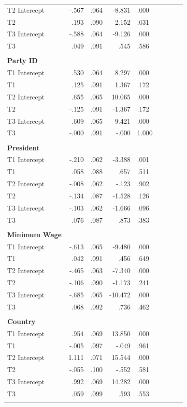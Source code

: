 \documentclass[12pt,econ]{sources/authesis}
\begin{document}
\begin{longtable}{lr@{}lr@{}lr@{}lr@{}l}
 T2 Intercept & -.567 & .064 & -8.831 & .000 \\
 T2 & .193 & .090 & 2.152 & .031 \\
 T3 Intercept & -.588 & .064 & -9.126 & .000 \\ 
 T3 & .049 & .091 & .545 & .586 \\ 
 & & & & \\  
  \textbf{Party ID} & & & & \\  
 T1 Intercept & .530 & .064 & 8.297 & .000 \\
 T1 & .125 & .091 & 1.367 & .172 \\
 T2 Intercept & .655 & .065 & 10.065 & .000 \\
 T2 & -.125 & .091 & -1.367 & .172 \\
 T3 Intercept & .609 & .065 & 9.421 & .000 \\ 
 T3 & -.000 & .091 & -.000 & 1.000 \\ 
 & & & & \\  
\textbf{President} & & & & \\  
 T1 Intercept & -.210 & .062 & -3.388 & .001 \\ 
 T1 & .058 & .088 & .657 & .511 \\ 
 T2 Intercept & -.008 & .062 & -.123 & .902 \\ 
 T2 & -.134 & .087 & -1.528 & .126 \\ 
 T3 Intercept & -.103 & .062 & -1.666 & .096 \\
 T3 & .076 & .087 & .873 & .383 \\ 
 & & & & \\  
\textbf{Minimum Wage} & & & & \\  
 T1 Intercept & -.613 & .065 & -9.480 & .000 \\ 
 T1 & .042 & .091 & .456 & .649 \\ 
 T2 Intercept & -.465 & .063 & -7.340 & .000 \\
 T2 & -.106 & .090 & -1.173 & .241 \\
 T3 Intercept & -.685 & .065 & -10.472 & .000 \\ 
 T3 & .068 & .092 & .736 & .462 \\
 & & & & \\  
\textbf{Country} & & & & \\  
 T1 Intercept & .954 & .069 & 13.850 & .000 \\ 
 T1 & -.005 & .097 & -.049 & .961 \\ 
 T2 Intercept & 1.111 & .071 & 15.544 & .000 \\ 
 T2 & -.055 & .100 & -.552 & .581 \\ 
 T3 Intercept & .992 & .069 & 14.282 & .000 \\
 T3 & .059 & .099 & .593 & .553 \\ 
 \hline \\[-1.8ex]
 \end{longtable}
\dsp
\end{document}
